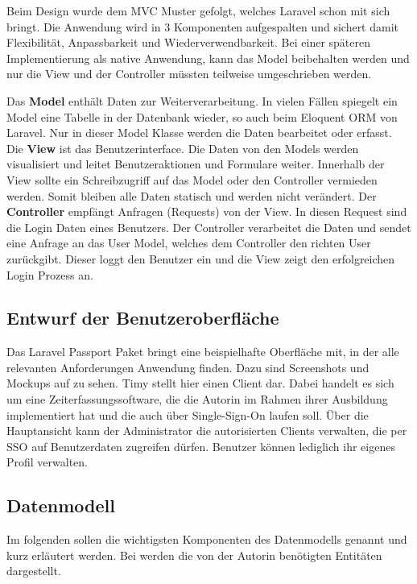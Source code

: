 Beim Design wurde dem \ac{MVC} Muster gefolgt, welches Laravel schon mit sich bringt. Die Anwendung wird in 3 Komponenten aufgespalten und sichert damit Flexibilität, Anpassbarkeit und Wiederverwendbarkeit.
Bei einer späteren Implementierung als native Anwendung, kann das Model beibehalten werden und nur die View und der Controller müssten teilweise umgeschrieben werden.

Das \textbf{Model} enthält Daten zur Weiterverarbeitung. In vielen Fällen spiegelt ein Model
eine Tabelle in der Datenbank wieder, so auch beim Eloquent \ac{ORM} von Laravel. Nur in dieser Model Klasse werden die Daten bearbeitet oder erfasst. 
Die \textbf{View} ist das Benutzerinterface. Die Daten von den Models werden visualisiert und leitet \zB Benutzeraktionen und Formulare weiter. Innerhalb der View sollte ein Schreibzugriff auf das Model oder den Controller vermieden werden. Somit bleiben alle Daten statisch und werden nicht verändert.
Der \textbf{Controller} empfängt Anfragen (Requests) von der View. In diesen Request sind \bspw die Login Daten eines Benutzers. Der Controller verarbeitet die Daten und sendet eine Anfrage an das User Model, welches dem Controller den richten User zurückgibt. Dieser loggt den Benutzer ein und die View zeigt den erfolgreichen Login Prozess an. 

\subsection{Entwurf der Benutzeroberfläche}
\label{sec:Benutzeroberflaeche} 

Das Laravel Passport Paket bringt eine beispielhafte Oberfläche mit, in der alle relevanten Anforderungen Anwendung finden. 
Dazu sind Screenshots und Mockups auf   zu sehen. Timy stellt hier einen Client dar. Dabei handelt es sich um eine Zeiterfassungssoftware, die die Autorin im Rahmen ihrer Ausbildung implementiert hat und die auch über Single-Sign-On laufen soll. 
Über die Hauptansicht kann der Administrator die autorisierten Clients verwalten, die per \ac{SSO} auf  Benutzerdaten zugreifen dürfen. Benutzer können lediglich ihr eigenes Profil verwalten.

\subsection{Datenmodell}
\label{sec:Datenmodell}

Im folgenden sollen die wichtigsten Komponenten des Datenmodells genannt und kurz erläutert werden. Bei  werden die von der Autorin benötigten Entitäten dargestellt. 

